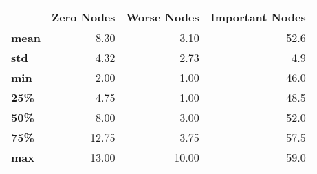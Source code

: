 \begin{tabular}{lrrr}
\toprule
{} &  Zero Nodes &  Worse Nodes &  Important Nodes \\
\midrule
\textbf{mean} &        8.30 &         3.10 &             52.6 \\
\textbf{std } &        4.32 &         2.73 &              4.9 \\
\textbf{min } &        2.00 &         1.00 &             46.0 \\
\textbf{25\% } &        4.75 &         1.00 &             48.5 \\
\textbf{50\% } &        8.00 &         3.00 &             52.0 \\
\textbf{75\% } &       12.75 &         3.75 &             57.5 \\
\textbf{max } &       13.00 &        10.00 &             59.0 \\
\bottomrule
\end{tabular}

